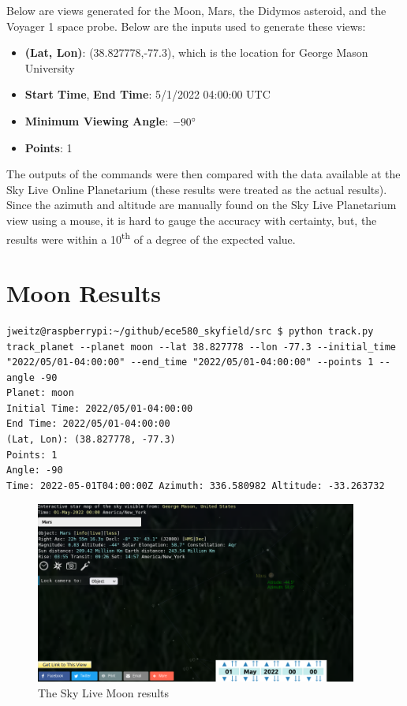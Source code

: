 \documentclass[../main.tex]{subfiles}
\begin{document}
Below are views generated for the Moon, Mars, the Didymos asteroid, and the Voyager 1 space probe. Below are the inputs used to generate these views:

\begin{itemize}
    \item \textbf{(Lat, Lon)}:  (38.827778,-77.3), which is the location for George Mason University
    \item \textbf{Start Time}, \textbf{End Time}: 5/1/2022 04:00:00 UTC
    \item \textbf{Minimum Viewing Angle}: \(-90\degree\)
    \item \textbf{Points}: 1
\end{itemize}

The outputs of the commands were then compared with the data available at the Sky Live Online Planetarium (these results were treated as the actual results). Since the azimuth and altitude are manually found on the Sky Live Planetarium view using a mouse, it is hard to gauge the accuracy with certainty, but, the results were within a 10\textsuperscript{th} of a degree of the expected value. 

\section{Moon Results}

\begin{lstlisting}
jweitz@raspberrypi:~/github/ece580_skyfield/src $ python track.py track_planet --planet moon --lat 38.827778 --lon -77.3 --initial_time "2022/05/01-04:00:00" --end_time "2022/05/01-04:00:00" --points 1 --angle -90
Planet: moon
Initial Time: 2022/05/01-04:00:00
End Time: 2022/05/01-04:00:00
(Lat, Lon): (38.827778, -77.3)
Points: 1
Angle: -90
Time: 2022-05-01T04:00:00Z Azimuth: 336.580982 Altitude: -33.263732
\end{lstlisting}

\begin{figure}[H]
    \centering
    \includegraphics[width=300pt]{components/photos/mars_crop.png}
    \caption{The Sky Live Moon results}
    \label{fig:skylive_moon}
\end{figure}
\end{document}
